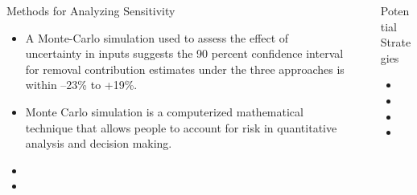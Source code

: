 \documentclass[final]{beamer}\usepackage[]{graphicx}\usepackage[]{color}
\newlength{\sepwid}
\newlength{\onecolwid}
\newlength{\twocolwid}
\begin{document}
\begin{frame}[t]
\begin{columns}[t]
\begin{column}{\twocolwid}
\begin{columns}[t,totalwidth=\twocolwid]
\begin{column}{\onecolwid}
\begin{block}{Methods for Analyzing Sensitivity}
\begin{itemize}
\item A Monte-Carlo simulation used to assess the effect of uncertainty in inputs suggests the 90 percent confidence interval for removal contribution estimates under the three approaches is within –23\% to +19\%.
\vspace{2ex}
\item Monte Carlo simulation is a computerized mathematical technique that allows people to account for risk in quantitative analysis and decision making.
\item
\item
\end{itemize}
\end{block}


\end{column} %

\end{columns} %

\end{column} %

\begin{column}{\sepwid}\end{column} %

\begin{column}{\onecolwid} %


\begin{block}{Potential Strategies}
\vspace{0ex}
\begin{itemize}
\item
\item
\item
\item
\end{itemize}
\vspace{0ex}
\vfill
\end{block}
\vfill



\end{column}
\end{columns}
\end{frame}
\end{document}
